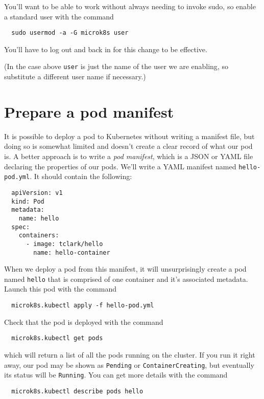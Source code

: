 \documentclass{article}
\begin{document}
You'll want to be able to work without always needing to invoke sudo, so enable a standard user with the command

\begin{verbatim}
  sudo usermod -a -G microk8s user
\end{verbatim}

You'll have to log out and back in for this change to be effective.

(In the case above \texttt{user} is just the name of the user we are enabling, so substitute a different user name if necessary.)

\section{Prepare a pod manifest}
It is possible to deploy a pod to Kubernetes without writing a manifest file, but doing so is somewhat limited and doesn't create a clear record of what our pod is. A better approach is to write a \emph{pod manifest}, which is a JSON or YAML file declaring the properties of our pods. We'll write a YAML manifest named \texttt{hello-pod.yml}. It should contain the following:

\begin{verbatim}
  apiVersion: v1
  kind: Pod
  metadata:
    name: hello
  spec:
    containers:
      - image: tclark/hello
        name: hello-container
\end{verbatim}

When we deploy a pod from this manifest, it will unsurprisingly create a pod named \texttt{hello} that is comprised of one container and it's associated metadata.  Launch this pod with the command

\begin{verbatim}
  microk8s.kubectl apply -f hello-pod.yml
\end{verbatim}  

Check that the pod is deployed with the command

\begin{verbatim}
  microk8s.kubectl get pods
\end{verbatim} 

which will return a list of all the pods running on the cluster. If you run it right away, our pod may be shown as \texttt{Pending} or \texttt{ContainerCreating}, but eventually its status will be \texttt{Running}. You can get more details with the command

\begin{verbatim}
  microk8s.kubectl describe pods hello
\end{verbatim} 
\end{document}
